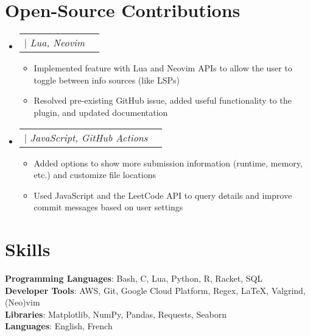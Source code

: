 \documentclass[letterpaper,11pt]{article}
\makeatletter
\newcommand{\resumeItem}[1]{
  \item\small{
    {#1 \vspace{-2pt}}
  }
}
\newcommand{\resumeProjectHeading}[2]{
    \item
    \begin{tabular*}{0.97\textwidth}{l@{\extracolsep{\fill}}r}
      \small#1 & #2 \\
    \end{tabular*}\vspace{-7pt}
}
\newcommand{\resumeSubHeadingListStart}{\begin{itemize}[leftmargin=0.15in, label={}]}
\newcommand{\resumeSubHeadingListEnd}{\end{itemize}}
\newcommand{\resumeItemListStart}{\begin{itemize}}
\newcommand{\resumeItemListEnd}{\end{itemize}\vspace{-5pt}}
\newcommand{\myuline}[1]{%
    \uline{\phantom{#1}}%
    \llap{\contour{white}{#1}}%
}
\makeatother
\begin{document}
\section{Open-Source Contributions}
    \resumeSubHeadingListStart
    \resumeProjectHeading
    {{\href{https://github.com/lewis6991/hover.nvim/pull/55}{\myuline{\textbf{Hover.nvim} \textnormal{\faGithub}}}} $|$ \textit{Lua, Neovim}}{}
        \resumeItemListStart
          \resumeItem{Implemented feature with Lua and Neovim APIs to allow the user to toggle between info sources (like LSPs)}
          \resumeItem{Resolved pre-existing GitHub issue, added useful functionality to the plugin, and updated documentation}
        \resumeItemListEnd
    \resumeProjectHeading
    {{\href{https://github.com/joshcai/leetcode-sync/pull/46}{\myuline{\textbf{LeetCode Sync} \textnormal{\faGithub}}}} $|$ \textit{JavaScript, GitHub Actions}}{}
        \resumeItemListStart
          \resumeItem{Added options to show more submission information (runtime, memory, etc.) and customize file locations}
          \resumeItem{Used JavaScript and the LeetCode API to query details and improve commit messages based on user settings}
        \resumeItemListEnd
    \resumeSubHeadingListEnd


%
\section{Skills}
 \begin{itemize}[leftmargin=0.15in, label={}]
    \small{\item{
     \textbf{Programming Languages}{: Bash, C, Lua, Python, R, Racket, SQL} \\
     \textbf{Developer Tools}{: AWS, Git, Google Cloud Platform, Regex, \LaTeX, Valgrind, (Neo)vim} \\
     \textbf{Libraries}{: Matplotlib, NumPy, Pandas, Requests, Seaborn} \\
    \textbf{Languages}{: English, French}
    }}
 \end{itemize}


\end{document}
